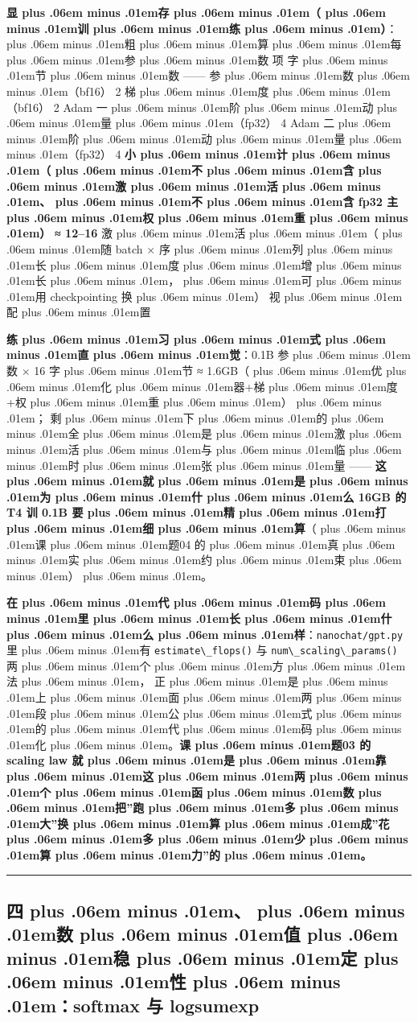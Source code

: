 \documentclass[
]{article}
\newcommand{\passthrough}[1]{#1}
\def\zh#1{{\zhfont #1}}
\def\sym#1{{\symfont #1}}
\def\zhglue{\hskip0pt plus .06em minus .01em}
\begin{document}
\textbf{\zh{显\zhglue 存\zhglue （\zhglue 训\zhglue 练\zhglue ）}}\zh{：\zhglue 粗\zhglue 算\zhglue 每\zhglue 参\zhglue 数} \textbar{} \zh{项} \textbar{} \zh{字\zhglue 节\zhglue 数} \textbar{} \textbar---\textbar---\textbar{} \textbar{} \zh{参\zhglue 数\zhglue （}bf16\zh{）} \textbar{} 2 \textbar{} \textbar{} \zh{梯\zhglue 度\zhglue （}bf16\zh{）} \textbar{} 2 \textbar{} \textbar{} Adam \zh{一\zhglue 阶\zhglue 动\zhglue 量\zhglue （}fp32\zh{）} \textbar{} 4 \textbar{} \textbar{} Adam \zh{二\zhglue 阶\zhglue 动\zhglue 量\zhglue （}fp32\zh{）} \textbar{} 4 \textbar{} \textbar{} \textbf{\zh{小\zhglue 计\zhglue （\zhglue 不\zhglue 含\zhglue 激\zhglue 活\zhglue 、\zhglue 不\zhglue 含} fp32 \zh{主\zhglue 权\zhglue 重\zhglue ）}} \textbar{} \textbf{\sym{≈} 12--16} \textbar{} \textbar{} \zh{激\zhglue 活\zhglue （\zhglue 随} batch \sym{×} \zh{序\zhglue 列\zhglue 长\zhglue 度\zhglue 增\zhglue 长\zhglue ，\zhglue 可\zhglue 用} checkpointing \zh{换\zhglue ）} \textbar{} \zh{视\zhglue 配\zhglue 置} \textbar{}

\textbf{\zh{练\zhglue 习\zhglue 式\zhglue 直\zhglue 觉}}\zh{：}0.1B \zh{参\zhglue 数} \sym{×} 16 \zh{字\zhglue 节} \sym{≈} 1.6GB\zh{（\zhglue 优\zhglue 化\zhglue 器}+\zh{梯\zhglue 度}+\zh{权\zhglue 重\zhglue ）\zhglue ；} \zh{剩\zhglue 下\zhglue 的\zhglue 全\zhglue 是\zhglue 激\zhglue 活\zhglue 与\zhglue 临\zhglue 时\zhglue 张\zhglue 量} ------ \textbf{\zh{这\zhglue 就\zhglue 是\zhglue 为\zhglue 什\zhglue 么} 16GB \zh{的} T4 \zh{训} 0.1B \zh{要\zhglue 精\zhglue 打\zhglue 细\zhglue 算}}\zh{（\zhglue 课\zhglue 题}04 \zh{的\zhglue 真\zhglue 实\zhglue 约\zhglue 束\zhglue ）\zhglue 。}

\textbf{\zh{在\zhglue 代\zhglue 码\zhglue 里\zhglue 长\zhglue 什\zhglue 么\zhglue 样}}\zh{：}\passthrough{\lstinline!nanochat/gpt.py!} \zh{里\zhglue 有} \passthrough{\lstinline!estimate\_flops()!} \zh{与} \passthrough{\lstinline!num\_scaling\_params()!} \zh{两\zhglue 个\zhglue 方\zhglue 法\zhglue ，} \zh{正\zhglue 是\zhglue 上\zhglue 面\zhglue 两\zhglue 段\zhglue 公\zhglue 式\zhglue 的\zhglue 代\zhglue 码\zhglue 化\zhglue 。}\textbf{\zh{课\zhglue 题}03 \zh{的} scaling law \zh{就\zhglue 是\zhglue 靠\zhglue 这\zhglue 两\zhglue 个\zhglue 函\zhglue 数\zhglue 把}''\zh{跑\zhglue 多\zhglue 大}''\zh{换\zhglue 算\zhglue 成}''\zh{花\zhglue 多\zhglue 少\zhglue 算\zhglue 力}''\zh{的\zhglue 。}}

\begin{center}\rule{0.5\linewidth}{0.5pt}\end{center}

\subsection{\zh{四\zhglue 、\zhglue 数\zhglue 值\zhglue 稳\zhglue 定\zhglue 性\zhglue ：}softmax \zh{与} logsumexp}\label{ux56dbux6570ux503cux7a33ux5b9aux6027softmax-ux4e0e-logsumexp}
\end{document}

